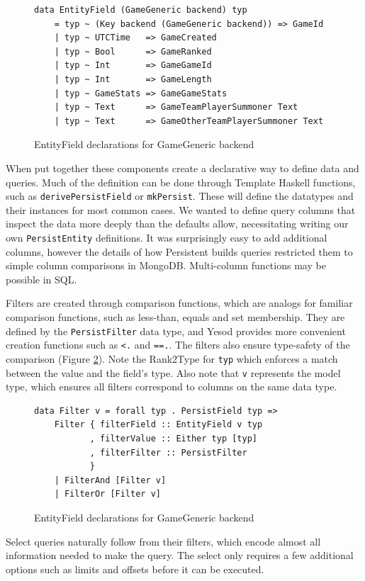 \documentclass[letterpaper,twocolumn,9pt]{article}
\newcommand{\code}[1]{\texttt{#1}}
\begin{document}
\begin{figure}[]
\footnotesize{
\begin{verbatim}
data EntityField (GameGeneric backend) typ
    = typ ~ (Key backend (GameGeneric backend)) => GameId
    | typ ~ UTCTime   => GameCreated
    | typ ~ Bool      => GameRanked
    | typ ~ Int       => GameGameId
    | typ ~ Int       => GameLength
    | typ ~ GameStats => GameGameStats
    | typ ~ Text      => GameTeamPlayerSummoner Text
    | typ ~ Text      => GameOtherTeamPlayerSummoner Text
\end{verbatim}
}
    \caption{EntityField declarations for GameGeneric backend}
    \label{EntityField}
\end{figure}

When put together these components create a declarative way to define data and queries.  Much of the definition can be done through Template Haskell functions, such as \code{derivePersistField} or \code{mkPersist}.  These will define the datatypes and their instances for most common cases.  We wanted to define query columns that inspect the data more deeply than the defaults allow, necessitating writing our own \code{PersistEntity} definitions.  It was surprisingly easy to add additional columns, however the details of how Persistent builds queries restricted them to simple column comparisons in MongoDB. Multi-column functions may be possible in SQL.

Filters are created through comparison functions, which are analogs for familiar comparison functions, such as less-than, equals and set membership.  They are defined by the \code{PersistFilter} data type, and Yesod provides more convenient creation functions such as \code{<.} and \code{==.}.  The filters also ensure type-safety of the comparison (Figure \ref{Filter}).  Note the Rank2Type for \code{typ} which enforces a match between the value and the field's type.  Also note that \code{v} represents the model type, which ensures all filters correspond to columns on the same data type.
\begin{figure}[]
\footnotesize{
\begin{verbatim}
data Filter v = forall typ . PersistField typ =>
    Filter { filterField :: EntityField v typ
           , filterValue :: Either typ [typ]
           , filterFilter :: PersistFilter
           }
    | FilterAnd [Filter v]
    | FilterOr [Filter v]
\end{verbatim}
}
    \caption{EntityField declarations for GameGeneric backend}
    \label{Filter}
\end{figure}
Select queries naturally follow from their filters, which encode almost all information needed to make the query.  The select only requires a few additional options such as limits and offsets before it can be executed.
\end{document}
